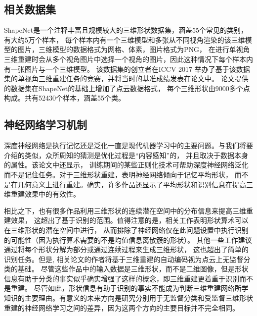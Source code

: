 \documentclass[bachelor, nocolorlinks, printoneside]{seuthesis} %
\begin{document}
\begin{Main}
\subsection{相关数据集}
ShapeNet\cite{chang2015shapenet}是一个注释丰富且规模较大的三维形状数据集，涵盖55个常见的类别，有大约5万个样本，
每个样本内有一个三维模型和多张从不同视角渲染的该三维模型的图片，三维模型的数据格式为网格、体素，图片格式为PNG，
在进行单视角三维重建时会从多个视角图片中选择一个视角的图片，因此这种情况下每个样本内有一张图片与一个三维模型。
该数据集的创立者在ICCV 2017 举办了基于该数据集的单视角三维重建任务的竞赛，并将当时的基准成绩发表在论文\cite{Yi2017LargeScale3S}中。
论文\cite{tatarchenko2019single}提供的数据集在ShapeNet\cite{chang2015shapenet}的基础上增加了点云数据格式，
每个三维形状由9000多个点构成。共有52430个样本，涵盖55个类。

\subsection{神经网络学习机制}
深度神经网络是执行记忆还是泛化一直是现代机器学习中的主要问题。与我们将要介绍的类似，众所周知的猜测是优化过程是“内容感知”的，
并且取决于数据本身的属性\cite{arpit2017closer}。该论文\cite{arpit2017closer}中还显示，
训练期间的某些正则化技术可帮助深度神经网络泛化而不是记住任务。对于三维形状重建，\cite{tatarchenko2019single}表明神经网络倾向于记忆平均形状，
而不是在几何意义上进行重建。确实，许多作品还显示了平均形状和识别信息在提高三维重建效果中的有效性\cite{kanazawa2018learning,pontes2018image2mesh,kurenkov2018deformnet}。

相比之下，也有很多作品利用三维形状的连续潜在空间中的分布信息\cite{li2018single,gwak2017weakly,sinha2017surfnet,li2018point,wu2018learning,yang20173d,yang2019pointflow}来提高三维重建效果，
这超出了基于识别的范围。值得注意的是，相关工作\cite{wu2016learning,girdhar2016learning}表明形状算术可以在三维形状的潜在空间中进行，
从而排除了神经网络仅在此问题设置中执行识别的可能性（因为执行算术需要的不是均值信息离散簇的形状）。
其他一些工作建议通过将每个形状分解为部分\cite{tulsiani2017learning,niu2018im2struct,sung2017complementme}或通过连续过程\cite{sun2018pointgrow,choy20163d}来生成三维形状，
这也超出了简单的识别任务。但是, 相关论文\cite{wu2016learning,achlioptas2017learning,yang2018foldingnet}的作者将基于三维重建的自动编码视为点云上无监督分类的基础。
尽管这些作品中的输入数据是三维形状，而不是二维图像，但是形状信息有助于分类的事实似乎确实增强了这样的概念，即三维重建更着重于识别而不是重建。
尽管如此，形状信息有助于识别的事实不能成为判断三维重建网络所学知识的主要理由。有意义的未来方向是研究分别用于无监督分类和受监督三维形状重建的神经网络学习之间的差异，因为这两个方向的主要目标并不完全相同。


\end{Main}
\end{document}
